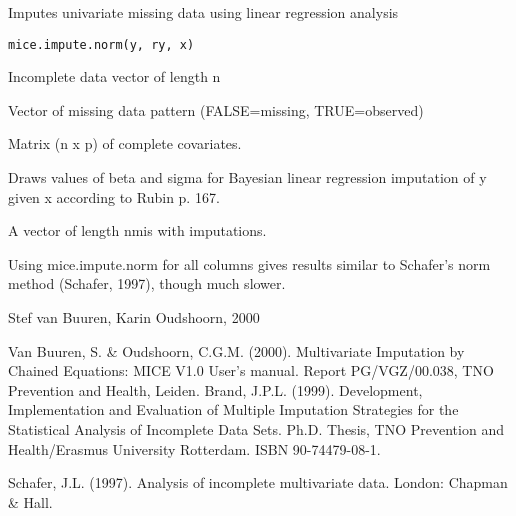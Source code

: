 \begin{Description}\relax
Imputes univariate missing data using linear regression analysis
\end{Description}
\begin{Usage}
\begin{verbatim}
mice.impute.norm(y, ry, x)
\end{verbatim}
\end{Usage}
\begin{Arguments}
\begin{ldescription}
\item[\code{y}] Incomplete data vector of length n
\item[\code{ry}] Vector of missing data pattern (FALSE=missing, TRUE=observed)
\item[\code{x}] Matrix (n x p) of complete covariates.
\end{ldescription}
\end{Arguments}
\begin{Details}\relax
Draws values of beta and sigma for Bayesian linear regression imputation 
of y given x according to Rubin p. 167.
\end{Details}
\begin{Value}
A vector of length nmis with imputations.
\end{Value}
\begin{Note}\relax
Using mice.impute.norm for all columns gives results similar to Schafer's norm 
method (Schafer, 1997), though much slower.
\end{Note}
\begin{Author}\relax
Stef van Buuren, Karin Oudshoorn, 2000
\end{Author}
\begin{References}\relax
Van Buuren, S. \& Oudshoorn, C.G.M. (2000). Multivariate Imputation by Chained Equations: 
MICE V1.0 User's manual. Report PG/VGZ/00.038, TNO Prevention and Health, Leiden.
Brand, J.P.L. (1999). Development, Implementation and Evaluation of Multiple Imputation Strategies for the Statistical Analysis of Incomplete Data Sets. Ph.D. Thesis, TNO Prevention and Health/Erasmus University Rotterdam. ISBN 90-74479-08-1. 

Schafer, J.L. (1997). Analysis of incomplete multivariate data. London: Chapman \& Hall.
\end{References}

